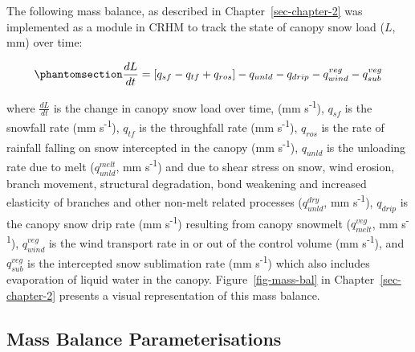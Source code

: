\documentclass[
  letterpaper,
]{tex/uofsthesis-cs}
\begin{document}
The following mass balance, as described in Chapter~\ref{sec-chapter-2}
was implemented as a module in CRHM to track the state of canopy snow
load (\(L\), mm) over time:

\begin{equation}\phantomsection\label{eq-canopy-mass-bal-04}{
\frac{dL}{dt} = 
[q_{sf} - q_{tf} + q_{ros}] - q_{unld} - q_{drip} - q_{wind}^{veg} - q_{sub}^{veg}
}\end{equation}

where \(\frac{dL}{dt}\) is the change in canopy snow load over time, (mm
s\textsuperscript{-1}), \(q_{sf}\) is the snowfall rate (mm
s\textsuperscript{-1}), \(q_{tf}\) is the throughfall rate (mm
s\textsuperscript{-1}), \(q_{ros}\) is the rate of rainfall falling on
snow intercepted in the canopy (mm s\textsuperscript{-1}), \(q_{unld}\)
is the unloading rate due to melt (\(q_{unld}^{melt}\), mm
s\textsuperscript{-1}) and due to shear stress on snow, wind erosion,
branch movement, structural degradation, bond weakening and increased
elasticity of branches and other non-melt related processes
(\(q_{unld}^{dry}\), mm s\textsuperscript{-1}), \(q_{drip}\) is the
canopy snow drip rate (mm s\textsuperscript{-1}) resulting from canopy
snowmelt (\(q_{melt}^{veg}\), mm s\textsuperscript{-1}),
\(q_{wind}^{veg}\) is the wind transport rate in or out of the control
volume (mm s\textsuperscript{-1}), and \(q_{sub}^{veg}\) is the
intercepted snow sublimation rate (mm s\textsuperscript{-1}) which also
includes evaporation of liquid water in the canopy.
Figure~\ref{fig-mass-bal} in Chapter~\ref{sec-chapter-2} presents a
visual representation of this mass balance.

\subsection{Mass Balance
Parameterisations}\label{mass-balance-parameterisations}
\end{document}
